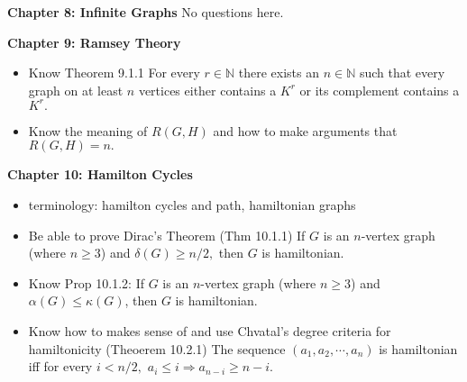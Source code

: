 \documentclass[12pt]{article}
\begin{document}
\noindent \textbf{Chapter 8: Infinite Graphs} No questions here.

\noindent \textbf{Chapter 9: Ramsey Theory} 
	\begin{itemize}
	\item Know Theorem 9.1.1 For every $r \in \mathbb{N}$  there exists an $n \in \mathbb{N}$ such that every graph on at least $n$ vertices either contains a $K^r$ or its complement contains a $K^r.$
	\item Know the meaning of $R(G,H)$ and how to make arguments that $R(G,H)=n.$
	\end{itemize}

\noindent \textbf{Chapter 10: Hamilton Cycles}
	\begin{itemize}
	\item terminology: hamilton cycles and path, hamiltonian graphs
	\item Be able to prove Dirac's Theorem (Thm 10.1.1) If $G$ is an $n$-vertex graph (where $n \geq 3$) and $\delta(G) \geq n/2,$ then $G$ is hamiltonian.
	\item Know Prop 10.1.2: If $G$ is an $n$-vertex graph (where $n \geq 3$) and $\alpha(G) \leq \kappa(G)$, then $G$ is hamiltonian. 
	\item Know how to makes sense of and use Chvatal's degree criteria for hamiltonicity (Theoerem 10.2.1) The sequence $(a_1,a_2,\cdots,a_n)$ is hamiltonian iff for every $i < n/2,$ $a_i\leq i \Longrightarrow a_{n-i} \geq n-i.$
	\end{itemize}
\end{document}
